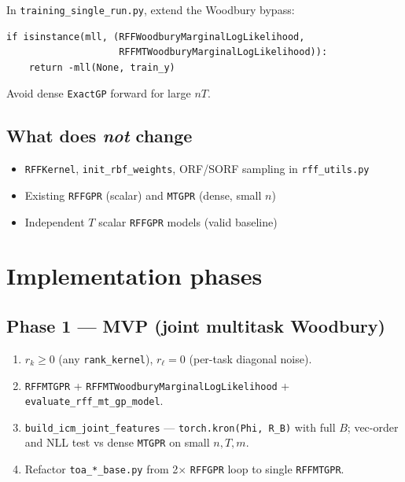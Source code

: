\documentclass[11pt]{article}
\theoremstyle{plain}
\begin{document}
In \texttt{training\_single\_run.py}, extend the Woodbury bypass:
\begin{planbox}
\begin{verbatim}
if isinstance(mll, (RFFWoodburyMarginalLogLikelihood,
                    RFFMTWoodburyMarginalLogLikelihood)):
    return -mll(None, train_y)
\end{verbatim}
\end{planbox}
Avoid dense \texttt{ExactGP} forward for large $nT$.

\subsection{What does \emph{not} change}

\begin{samebox}
\begin{itemize}[nosep]
  \item \texttt{RFFKernel}, \texttt{init\_rbf\_weights}, ORF/SORF sampling in \texttt{rff\_utils.py}
  \item Existing \texttt{RFFGPR} (scalar) and \texttt{MTGPR} (dense, small $n$)
  \item Independent $T$ scalar \texttt{RFFGPR} models (valid baseline)
\end{itemize}
\end{samebox}

\section{Implementation phases}

\subsection{Phase 1 --- MVP (joint multitask Woodbury)}

\begin{enumerate}
  \item $r_k \ge 0$ (any \texttt{rank\_kernel}), $r_\ell = 0$ (per-task diagonal noise).
  \item \texttt{RFFMTGPR} + \texttt{RFFMTWoodburyMarginalLogLikelihood} + \texttt{evaluate\_rff\_mt\_gp\_model}.
  \item \texttt{build\_icm\_joint\_features} --- \texttt{torch.kron(Phi, R\_B)} with full $B$;
        vec-order and NLL test vs dense \texttt{MTGPR} on small $n,T,m$.
  \item Refactor \texttt{toa\_*\_base.py} from 2$\times$ \texttt{RFFGPR} loop to single \texttt{RFFMTGPR}.
\end{enumerate}
\end{document}
